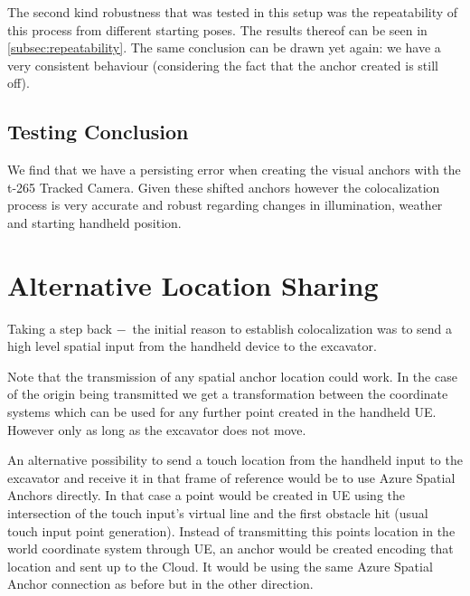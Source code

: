 The second kind robustness that was tested in this setup was the repeatability of this process from different starting poses. The results thereof can be seen in \cref{subsec:repeatability}. The same conclusion can be drawn yet again: we have a very consistent behaviour (considering the fact that the anchor created is still off).

\subsection{Testing Conclusion}\label{subsec:testing_conclusion}

We find that we have a persisting error when creating the visual anchors with the t-265 Tracked Camera. Given these shifted anchors however the colocalization process is very accurate and robust regarding changes in illumination, weather and starting handheld position.

\section{Alternative Location Sharing}\label{sec:alternative_location_transfer}

Taking a step back $-$ the initial reason to establish colocalization was to send a high level spatial input from the handheld device to the excavator.

Note that the transmission of any spatial anchor location could work. In the case of the origin being transmitted we get a transformation between the coordinate systems which can be used for any further point created in the handheld UE. However only as long as the excavator does not move. 

An alternative possibility to send a touch location from the handheld input to the excavator and receive it in that frame of reference would be to use Azure Spatial Anchors directly. In that case a point would be created in UE using the intersection of the touch input's virtual line and the first obstacle hit (usual touch input point generation). Instead of transmitting this points location in the world coordinate system through UE, an anchor would be created encoding that location and sent up to the Cloud. It would be using the same Azure Spatial Anchor connection as before but in the other direction. 